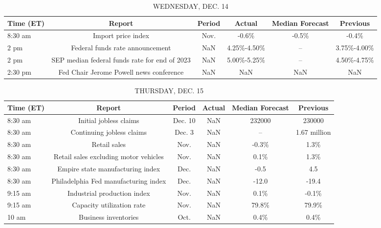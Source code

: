 \documentclass{article}%
\begin{document}
%


\begin{table}[htbp]%
\caption{WEDNESDAY, DEC. 14}%
\centering%
\begin{adjustbox}{width=1\textwidth}%
\begin{tabular}{lccccc}
\toprule
Time (ET) &                                        Report & Period &      Actual & Median Forecast &    Previous \\
\midrule
  8:30 am &                            Import price index &   Nov. &       -0.6\% &           -0.5\% &       -0.4\% \\
     2 pm &               Federal funds rate announcement &    NaN & 4.25\%-4.50\% &              -- & 3.75\%-4.00\% \\
     2 pm & SEP median federal funds rate for end of 2023 &    NaN & 5.00\%-5.25\% &              -- & 4.50\%-4.75\% \\
  2:30 pm &       Fed Chair Jerome Powell news conference &    NaN &         NaN &             NaN &         NaN \\
\bottomrule
\end{tabular}
%
\end{adjustbox}%
\end{table}

%


\begin{table}[htbp]%
\caption{THURSDAY, DEC. 15}%
\centering%
\begin{adjustbox}{width=1\textwidth}%
\begin{tabular}{lccccc}
\toprule
Time (ET) &                                Report &  Period & Actual & Median Forecast &     Previous \\
\midrule
  8:30 am &                Initial jobless claims & Dec. 10 &    NaN &          232000 &       230000 \\
  8:30 am &             Continuing jobless claims &  Dec. 3 &    NaN &              -- & 1.67 million \\
  8:30 am &                          Retail sales &    Nov. &    NaN &           -0.3\% &         1.3\% \\
  8:30 am & Retail sales excluding motor vehicles &    Nov. &    NaN &            0.1\% &         1.3\% \\
  8:30 am &      Empire state manufacturing index &    Dec. &    NaN &            -0.5 &          4.5 \\
  8:30 am &  Philadelphia Fed manufacturing index &    Dec. &    NaN &           -12.0 &        -19.4 \\
  9:15 am &           Industrial production index &    Nov. &    NaN &            0.1\% &        -0.1\% \\
  9:15 am &             Capacity utilization rate &    Nov. &    NaN &           79.8\% &        79.9\% \\
    10 am &                  Business inventories &    Oct. &    NaN &            0.4\% &         0.4\% \\
\bottomrule
\end{tabular}
%
\end{adjustbox}%
\end{table}
\end{document}
